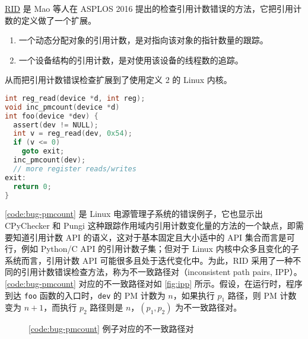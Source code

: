 \href{https://dl.acm.org/doi/10.1145/2980024.2872389}{RID} 是 Mao 等人在 ASPLOS 2016 提出的检查引用计数错误的方法，它把引用计数的定义做了一个扩展。

\begin{enumerate}
\item 一个动态分配对象的引用计数，是对指向该对象的指针数量的跟踪。
\item 一个设备结构的引用计数，是对使用该设备的线程数的追踪。
\end{enumerate}

从而把引用计数错误检查扩展到了使用定义 2 的 Linux 内核。

\begin{lstfloat}
\begin{lstlisting}[language={C},caption={错误的 Linux 电源管理子系统代码},label={code:bug-pmcount}]
int reg_read(device *d, int reg);
void inc_pmcount(device *d)
int foo(device *dev) {
  assert(dev != NULL);
  int v = reg_read(dev, 0x54);
  if (v <= 0)
    goto exit;
  inc_pmcount(dev);
  // more register reads/writes
exit:
  return 0;
}
\end{lstlisting}
\end{lstfloat}

\autoref{code:bug-pmcount} 是 Linux 电源管理子系统的错误例子，它也显示出 CPyChecker 和 Pungi 这种跟踪作用域内引用计数变化量的方法的一个缺点，即需要知道引用计数 API 的语义，这对于基本固定且大小适中的 API 集合而言是可行，例如 Python/C API 的引用计数子集；但对于 Linux 内核中众多且变化的子系统而言，引用计数 API 可能很多且处于迭代变化中。为此，RID 采用了一种不同的引用计数错误检查方法，称为不一致路径对（inconsistent path pairs, IPP）。\autoref{code:bug-pmcount} 对应的不一致路径对如 \autoref{fig:ipp} 所示。假设，在运行时，程序到达 \texttt{foo} 函数的入口时，\texttt{dev} 的 PM 计数为 $n$，如果执行 $p_1$ 路径，则 PM 计数变为 $n+1$，而执行 $p_2$ 路径则是 $n$，$(p_1, p_2)$ 为不一致路径对。

\begin{figure}[H]
\centering
{}
\caption{\autoref{code:bug-pmcount} 例子对应的不一致路径对}
\label{fig:ipp}
\end{figure}

